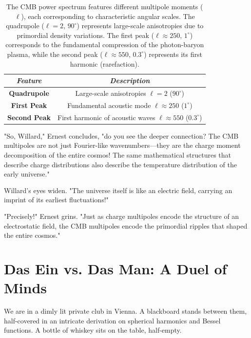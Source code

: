 \begin{table}[h]
\centering
\begin{tabular}{|c|c|}
\hline
\textit{Feature} & \textit{Description} \\
\hline
\textbf{Quadrupole} & Large-scale anisotropies \(\ell=2 \) (\(90^\circ\)) \\
\hline
\textbf{First Peak} & Fundamental acoustic mode \(\ell \approx 250\) (\(1^\circ\)) \\
\hline
\textbf{Second Peak} & First harmonic of acoustic waves \(\ell \approx 550\) (\(0.3^\circ\)) \\
\hline
\end{tabular}
\caption{The CMB power spectrum features different multipole moments (\(\ell\)), each corresponding to characteristic angular scales. The quadrupole (\(\ell=2\), \(90^\circ\)) represents large-scale anisotropies due to primordial density variations. The first peak (\(\ell \approx 250\), \(1^\circ\)) corresponds to the fundamental compression of the photon-baryon plasma, while the second peak (\(\ell \approx 550\), \(0.3^\circ\)) represents its first harmonic (rarefaction).}
\label{tab:CMB_multipoles}
\end{table}



"So, Willard," Ernest concludes, "do you see the deeper connection? The CMB multipoles are not just Fourier-like wavenumbers—they are the charge moment decomposition of the entire cosmos! The same mathematical structures that describe charge distributions also describe the temperature distribution of the early universe."

Willard's eyes widen. "The universe itself is like an electric field, carrying an imprint of its earliest fluctuations!"

"Precisely!" Ernest grins. "Just as charge multipoles encode the structure of an electrostatic field, the CMB multipoles encode the primordial ripples that shaped the entire cosmos."



\section*{Das Ein vs. Das Man: A Duel of Minds}

We are in a dimly lit private club in Vienna. A blackboard stands between them, half-covered in an intricate derivation on spherical harmonics and Bessel functions. A bottle of whiskey sits on the table, half-empty.

